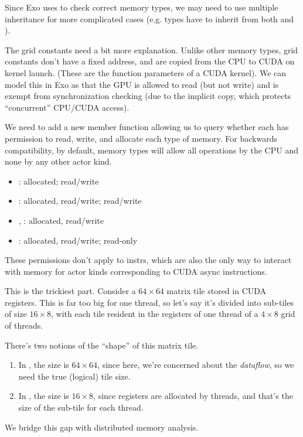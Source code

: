 \filbreak
Since Exo uses  to check correct memory types, we may need to use multiple inheritance for more complicated cases (e.g.  types have to inherit from both  and ).

\filbreak
The grid constants need a bit more explanation.
Unlike other memory types, grid constants don't have a fixed address, and are copied from the CPU to CUDA on kernel launch.
(These are the function parameters of a CUDA kernel).
We can model this in Exo as  that the GPU is allowed to read (but not write) and is exempt from synchronization checking (due to the implicit copy, which protects ``concurrent'' CPU/CUDA access).

\filbreak
{} We need to add a new member function allowing us to query whether each  has permission to read, write, and allocate each type of memory.
For backwards compatibility, by default, memory types will allow all operations by the CPU and none by any other actor kind.

\filbreak
\begin{itemize}
  \item {}:  allocated;  read/write
  \item {}:  allocated, read/write;  read/write
  \item {}, :  allocated, read/write
  \item {}:  allocated, read/write;  read-only
\end{itemize}

\filbreak
These permissions don't apply to instrs, which are also the only way to interact with memory for actor kinds corresponding to CUDA async instructions.

\filbreak
{} This is the trickiest part.
Consider a $64 \times 64$ matrix tile stored in CUDA registers.
This is far too big for one thread, so let's say it's divided into sub-tiles of size $16 \times 8$, with each tile resident in the registers of one thread of a $4 \times 8$ grid of threads.

There's two notions of the ``shape'' of this matrix tile.
\begin{enumerate}
  \item In , the size is $64 \times 64$, since here, we're concerned about the \textit{dataflow}, so we need the true (logical) tile size.
  \item In , the size is $16 \times 8$, since registers are allocated by threads, and that's the size of the sub-tile for each thread.
\end{enumerate}
We bridge this gap with distributed memory analysis.


